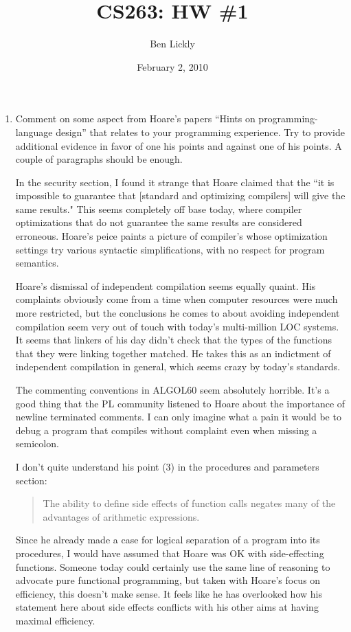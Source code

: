 \documentclass{article}
\title{CS263: HW \#1}
\author{Ben Lickly}
\date{February 2, 2010}
\begin{document}
\maketitle
\begin{enumerate}
  \item Comment on some aspect from Hoare's papers ``Hints on
  programming-language design'' that relates to your programming experience. Try
  to provide additional evidence in favor of one his points and against one of
  his points. A couple of paragraphs should be enough.

In the security section, I found it strange that Hoare claimed that the ``it is
impossible to guarantee that [standard and optimizing compilers] will give the
same results." This seems completely off base today, where compiler optimizations
that do not guarantee the same results are considered erroneous.  Hoare's peice
paints a picture of compiler's whose optimization settings try various syntactic
simplifications, with no respect for program semantics.

Hoare's dismissal of independent compilation seems equally quaint.  His
complaints obviously come from a time when computer resources were much more
restricted, but the conclusions he comes to about avoiding independent
compilation seem very out of touch with today's multi-million LOC systems. It
seems that linkers of his day didn't check that the types of the functions that
they were linking together matched.  He takes this as an indictment of
independent compilation in general, which seems crazy by today's standards.

The commenting conventions in ALGOL60 seem absolutely horrible.  It's a good
thing that the PL community listened to Hoare about the importance of newline
terminated comments.  I can only imagine what a pain it would be to debug a
program that compiles without complaint even when missing a semicolon.

I don't quite understand his point (3) in the procedures and parameters section:
\begin{quote}
  The ability to define side effects of function calls negates many of the
  advantages of arithmetic expressions.
\end{quote}  
Since he already made a case for logical separation of a program into its
procedures, I would have assumed that Hoare was OK with side-effecting functions.
 Someone today could certainly use the same line of reasoning to advocate pure
functional programming, but taken with Hoare's focus on efficiency, this doesn't
make sense. It feels like he has overlooked how his statement here about side
effects conflicts with his other aims at having maximal efficiency.


\end{enumerate}
\end{document}
